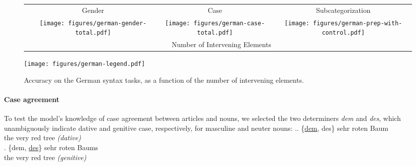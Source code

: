 
\begin{figure*}
	\begin{tabular}{cccc}
		& Gender & Case & Subcategorization \\ 
		\raisebox{1.7\height}{\rotatebox[origin=c]{90}{Accuracy}}
		&
\texttt{[image: figures/german-gender-total.pdf]} 
		&
		\texttt{[image: figures/german-case-total.pdf]}
		&
\texttt{[image: figures/german-prep-with-control.pdf]} \\ 
		&\multicolumn{3}{c}{Number of Intervening Elements}
	\end{tabular}
\centering\texttt{[image: figures/german-legend.pdf]}
\caption{Accuracy on the German syntax tasks, as a function of the number of intervening elements.}\label{fig:german-syntax}
\end{figure*}



\paragraph{Case agreement}
To test the model's knowledge of case agreement between articles and
nouns, we selected the two determiners \emph{dem} and \emph{des},
which unambiguously indicate dative and genitive case, respectively,
for masculine and neuter nouns: %
\ex.\ag. {\{\underline{dem}, des\}} sehr roten Baum \\
the very red {tree \emph{(dative)}} \\
\bg. {\{dem, \underline{des}\}} sehr roten Baums \\
the very red {tree \emph{(genitive)}} \\



